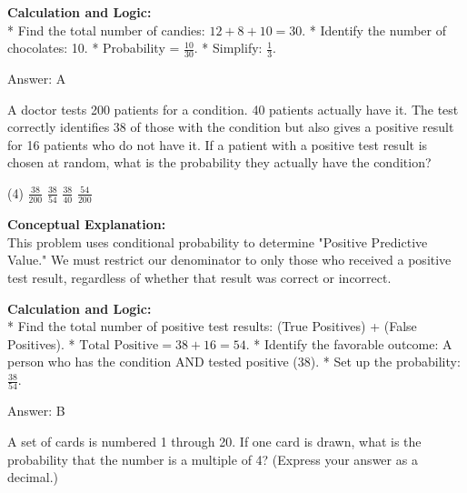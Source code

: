 \documentclass[11pt,paper=a4,answers]{exam}
\begin{document}
\begin{questions}
\begin{solution}
\textbf{Calculation and Logic:} \\
* Find the total number of candies: $12 + 8 + 10 = 30$.
* Identify the number of chocolates: 10.
* Probability = $\frac{10}{30}$.
* Simplify: $\frac{1}{3}$.

\vspace{30pt}

Answer: \colorbox{yellow!100}{A}
\end{solution}

\vspace{60pt}

\question
A doctor tests 200 patients for a condition. 40 patients actually have it. The test correctly identifies 38 of those with the condition but also gives a positive result for 16 patients who do not have it. If a patient with a positive test result is chosen at random, what is the probability they actually have the condition?
\begin{tasks}(4)
    \task $\frac{38}{200}$
    \task $\frac{38}{54}$
    \task $\frac{38}{40}$
    \task $\frac{54}{200}$
\end{tasks}

\begin{solution}
\textbf{Conceptual Explanation:} \\
This problem uses conditional probability to determine "Positive Predictive Value." We must restrict our denominator to only those who received a positive test result, regardless of whether that result was correct or incorrect.

\vspace{30pt}

\textbf{Calculation and Logic:} \\
* Find the total number of positive test results: (True Positives) + (False Positives).
* $\text{Total Positive} = 38 + 16 = 54$.
* Identify the favorable outcome: A person who has the condition AND tested positive (38).
* Set up the probability: $\frac{38}{54}$.

\vspace{30pt}

Answer: \colorbox{yellow!100}{B}
\end{solution}

\vspace{60pt}

\question
A set of cards is numbered 1 through 20. If one card is drawn, what is the probability that the number is a multiple of 4? (Express your answer as a decimal.)


\end{questions}
\end{document}
